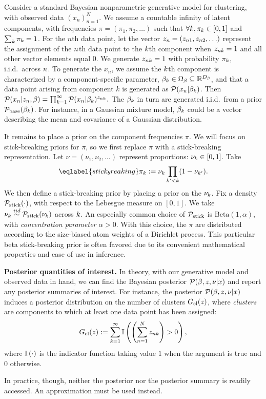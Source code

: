 Consider a standard Bayesian nonparametric generative model for clustering, with observed data $(x_n)_{n=1}^{N}$.
We assume a countable infinity of latent components, with frequencies $\pi = (\pi_1, \pi_2, \ldots)$ such that $\forall k, \pi_k \in [0,1]$ and $\sum_{k} \pi_k = 1$. For the $n$th data point, let the vector $z_n = (z_{n1}, z_{n2}, \ldots)$ represent the assignment of the $n$th data point to the $k$th component when $z_{nk} = 1$ and all other vector elements equal 0. We generate $z_{nk} = 1$ with probability $\pi_k$, i.i.d.\ across $n$. To generate the $x_n$, we assume the $k$th component is characterized by a component-specific parameter,
$\beta_k \in
\Omega_{\beta} \subseteq \mathbb{R}^{{D_{\beta}}}$, and that a data point arising from component $k$ is generated as $\mathcal{P}(x_n \vert \beta_k)$. Then
%
$
%
\p(\x_n \vert \z_\n, \beta) =
    \prod_{k=1}^\infty \p(\x_n \vert \beta_\k)^{\z_{\n\k}}.
%
$
The $\beta_k$ in turn are generated i.i.d.\ from a prior $\mathcal{P}_{\mathrm{base}}(\beta_k)$. For instance, in a Gaussian mixture model, $\beta_k$ could be a vector describing the mean and covariance of a Gaussian distribution.

It remains to place a prior on the component frequencies $\pi$. We will focus on stick-breaking priors for $\pi$, so we first replace $\pi$ with a stick-breaking representation. Let $\nu = (\nu_1, \nu_2, \ldots)$ represent proportions: $\nu_{k} \in [0, 1]$. Take
\begin{align}\eqlabel{stick_breaking}
%
\pi_\k := \nuk \prod_{\k' < \k} (1 - \nu_{\k'}).
%
\end{align}
We then define a stick-breaking prior by placing a prior on the $\nu_{k}$.
Fix a density $\mathcal{P}_{\mathrm{stick}}(\cdot)$, with
respect to the Lebesgue measure on $[0,1]$. We take $\nu_{k}\overset{iid}{\sim}\mathcal{P}_{\mathrm{stick}}(\nu_{k})$ across $k$.
An especially common choice of $\mathcal{P}_{\mathrm{stick}}$ is $\mathrm{Beta}(1, \alpha)$, with \emph{concentration parameter}
$\alpha > 0$. With this choice, the
$\pi$ are distributed according to the size-biased atom weights of a Dirichlet process.
This particular beta stick-breaking prior is often favored due to its convenient mathematical properties and ease of use in inference.

\noindent \textbf{Posterior quantities of interest.}
In theory, with our generative model and observed data in hand, we can find the Bayesian posterior
$\mathcal{P}(\beta, z, \nu | x)$ and report any posterior summaries of interest. For instance, the posterior $\mathcal{P}(\beta, z, \nu | x)$
induces a posterior distribution on the number of clusters $G_{\text{cl}}(z)$, where \emph{clusters} are components to which at least one
data point has been assigned:
\begin{align*}
  \nclusters(\z) := \sum_{k=1}^{\infty} \ind{ \left(\sum_{n=1}^{N}
  \z_{\n\k}\right) > 0},
\end{align*}
where $\mathbb{I}\left(\cdot\right)$ is the indicator function taking value $1$ when the argument
is true and $0$ otherwise.

In practice, though, neither the posterior nor the posterior summary is readily accessed. An approximation must be used instead.

